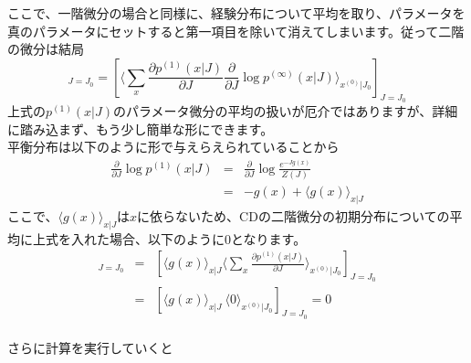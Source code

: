 \documentclass[11pt]{article}
\begin{document}
ここで、一階微分の場合と同様に、経験分布について平均を取り、パラメータを真のパラメータにセットすると第一項目を除いて消えてしまいます。従って二階の微分は結局
\begin{equation}
[\langle\frac{\partial^2}{\partial J^2}CD(p^{(0)}\|p^{(1)}(|J)) \rangle_{x^{(0)}|J_0}]_{J=J_0}=[\langle \sum_{x}\frac{\partial p^{(1)}(x|J)}{\partial J}\frac{\partial}{\partial J}\log{p^{(\infty)}(x|J)} \rangle_{x^{(0)}|J_0}]_{J=J_0}
\end{equation}
上式の$p^{(1)}(x|J)$のパラメータ微分の平均の扱いが厄介ではありますが、詳細に踏み込まず、もう少し簡単な形にできます。\\
平衡分布は以下のように形で与えらえられていることから\\
\begin{eqnarray}
	\frac{\partial}{\partial J}\log p^{(1)}(x|J)&=&\frac{\partial}{\partial J}\log{\frac{e^{-Jg(x)}}{Z(J)} }\\
	&=&-g(x)+\langle g(x) \rangle_{x|J}
\end{eqnarray}
ここで、$\langle g(x) \rangle_{x|J}$は$x$に依らないため、CDの二階微分の初期分布についての平均に上式を入れた場合、以下のように0となります。
\begin{eqnarray}
	[\langle \sum_{x}\frac{\partial p^{(1)}(x|J)}{\partial J}\langle g(x) \rangle_{x|J}	\rangle_{x^{(0)}|J_0}]_{J=J_0}&=&[\langle g(x) \rangle_{x|J} \langle \sum_{x}\frac{\partial p^{(1)}(x|J)}{\partial J} \rangle_{x^{(0)}|J_0}]_{J=J_0} \\
	&=&[\langle g(x) \rangle_{x|J}\ \langle0  \rangle_{x^{(0)}|J_0}]_{J=J_0}=0
\end{eqnarray}
\\
さらに計算を実行していくと
\end{document}

